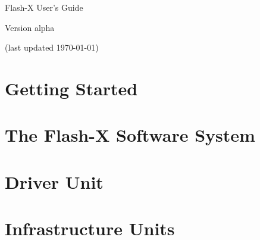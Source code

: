 \documentclass{book}
\newcommand{\thisFlashXVerNo}{alpha}
\newcommand{\clearemptydoublepage}{\newpage{\pagestyle{empty}\cleardoublepage}}
\begin{document}
\author{}
\frontmatter

\thispagestyle{empty}

\vspace*{2.5in}
\begin{center}
{\Huge Flash-X User's Guide}
\vskip 0.25in

{\Large Version \thisFlashXVerNo}

(last updated \today)


\end{center}
\clearemptydoublepage
{}

%
%

\clearemptydoublepage

\tableofcontents

\cleardoublepage


\setcounter{page}{1}
\setcounter{chapter}{0}
\setcounter{secnumdepth}{5}

\mainmatter




\part{Getting Started}


%
\part{The Flash-X Software System} 




\part{Driver Unit}


\part{Infrastructure Units}





\end{document}

